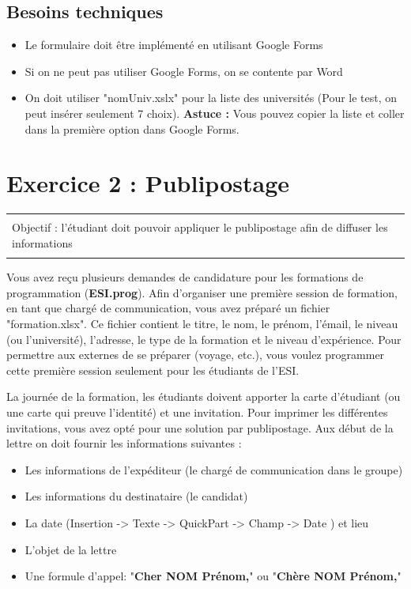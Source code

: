 \documentclass[11pt, a4paper]{article}
\begin{document}
\subsection*{Besoins techniques}

\begin{multicols}{2}
\begin{itemize}
	\item Le formulaire doit être implémenté en utilisant Google Forms
	\item Si on ne peut pas utiliser Google Forms, on se contente par Word
	\item On doit utiliser "nomUniv.xslx" pour la liste des universités (Pour le test, on peut insérer seulement 7 choix). \textbf{Astuce :} Vous pouvez copier la liste et coller dans la première option dans Google Forms.
\end{itemize}
\end{multicols}

\section*{Exercice 2 : Publipostage}

\vspace{-12pt}
\begin{tabular}{|p{\textwidth}|}
	\hline\\
	Objectif : l'étudiant doit pouvoir appliquer le publipostage afin de diffuser les informations   \\\\
	\hline
\end{tabular}

Vous avez reçu plusieurs demandes de candidature pour les formations de programmation (\textbf{ESI.prog}). 
Afin d'organiser une première session de formation, en tant que chargé de communication, vous avez préparé un fichier "formation.xlsx". 
Ce fichier contient le titre, le nom, le prénom, l'émail, le niveau (ou l'université), l'adresse, le type de la formation et le niveau d'expérience. 
Pour permettre aux externes de se préparer (voyage, etc.), vous voulez programmer cette première session seulement pour les étudiants de l'ESI.

La journée de la formation, les étudiants doivent apporter la carte d'étudiant (ou une carte qui preuve l'identité) et une invitation. 
Pour imprimer les différentes invitations, vous avez opté pour une solution par publipostage. 
Aux début de la lettre on doit fournir les informations suivantes : 
\begin{multicols}{2}
\begin{itemize}
	\item Les informations de l'expéditeur (le chargé de communication dans le groupe)
	\item Les informations du destinataire (le candidat)
	\item La date (Insertion -> Texte -> QuickPart -> Champ -> Date ) et lieu
	\item L'objet de la lettre
	\item Une formule d'appel: "\textbf{Cher NOM Prénom,}" ou "\textbf{Chère NOM Prénom,}"
\end{itemize}
\end{multicols}
\end{document}

